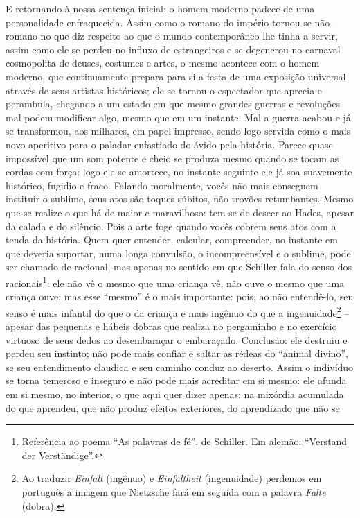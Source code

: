 E retornando à nossa sentença inicial: o homem moderno padece de uma
personalidade enfraquecida. Assim como o romano do império tornou-se
não-romano no que diz respeito ao que o mundo contemporâneo lhe tinha a
servir, assim como ele se perdeu no influxo de estrangeiros e se
degenerou no carnaval cosmopolita de deuses, costumes e artes, o mesmo
acontece com o homem moderno, que continuamente prepara para si a festa
de uma exposição universal através de seus artistas históricos; ele se
tornou o espectador que aprecia e perambula, chegando a um estado em que
mesmo grandes guerras e revoluções mal podem modificar algo, mesmo que
em um instante. Mal a guerra acabou e já se transformou, aos milhares,
em papel impresso, sendo logo servida como o mais novo aperitivo para o
paladar enfastiado do ávido pela história. Parece quase impossível que
um som potente e cheio se produza mesmo quando se tocam as cordas com
força: logo ele se amortece, no instante seguinte ele já soa suavemente
histórico, fugidio e fraco. Falando moralmente, vocês não mais conseguem
instituir o sublime, seus atos são toques súbitos, não trovões
retumbantes. Mesmo que se realize o que há de maior e maravilhoso:
tem-se de descer ao Hades, apesar da calada e do silêncio. Pois a arte
foge quando vocês cobrem seus atos com a tenda da história. Quem quer
entender, calcular, compreender, no instante em que deveria suportar,
numa longa convulsão, o incompreensível e o sublime, pode ser chamado de
racional, mas apenas no sentido em que Schiller fala do senso dos
racionais\footnote{Referência ao poema ``As palavras de fé'', de
  Schiller. Em alemão: ``Verstand der Verständige''.}: ele não vê o
mesmo que uma criança vê, não ouve o mesmo que uma criança ouve; mas
esse ``mesmo'' é o mais importante: pois, ao não entendê-lo, seu senso é
mais infantil do que o da criança e mais ingênuo do que a
ingenuidade\footnote{Ao traduzir \emph{Einfalt} (ingênuo) e
  \emph{Einfaltheit} (ingenuidade) perdemos em português a imagem que
  Nietzsche fará em seguida com a palavra \emph{Falte} (dobra).} --
apesar das pequenas e hábeis dobras que realiza no pergaminho e no
exercício virtuoso de seus dedos ao desembaraçar o embaraçado.
Conclusão: ele destruiu e perdeu seu instinto; não pode mais confiar e
saltar as rédeas do ``animal divino'', se seu entendimento claudica e
seu caminho conduz ao deserto. Assim o indivíduo se torna temeroso e
inseguro e não pode mais acreditar em si mesmo: ele afunda em si mesmo,
no interior, o que aqui quer dizer apenas: na mixórdia acumulada do que
aprendeu, que não produz efeitos exteriores, do aprendizado que não se
